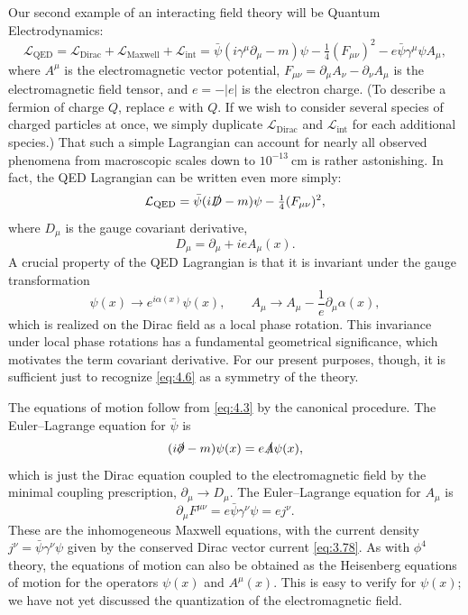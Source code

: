 Our second example of an interacting field theory will be Quantum
Electrodynamics:
\begin{equation}
  \mathcal{L}_{\mathrm{QED}} = \mathcal{L}_{\mathrm{Dirac}}
    + \mathcal{L}_{\mathrm{Maxwell}} + \mathcal{L}_{\mathrm{int}}
  = \bar{\psi}(i\gamma^\mu\partial_\mu - m)\psi
    - \tfrac{1}{4}(F_{\mu\nu})^2 - e\bar{\psi}\gamma^\mu\psi A_\mu ,
  \label{eq:4.3}
\end{equation}
where $A^\mu$ is the electromagnetic vector potential,
$F_{\mu\nu} = \partial_\mu A_\nu - \partial_\nu A_\mu$ is the electromagnetic
field tensor, and $e = -|e|$ is the electron charge.  (To describe a fermion
of charge $Q$, replace $e$ with $Q$.  If we wish to consider several species
of charged particles at once, we simply duplicate $\mathcal{L}_{\mathrm{Dirac}}$
and $\mathcal{L}_{\mathrm{int}}$ for each additional species.)  That such a
simple Lagrangian can account for nearly all observed phenomena from
macroscopic scales down to $10^{-13}\ \mathrm{cm}$ is rather astonishing.
In fact, the QED Lagrangian can be written even more simply:
\begin{equation}
  \mathcal{L}_{\mathrm{QED}} = \bar{\psi}(i\slashed{D} - m)\psi
    - \tfrac{1}{4}(F_{\mu\nu})^2 ,
  \label{eq:4.4}
\end{equation}
where $D_\mu$ is the gauge covariant derivative,
\begin{equation}
  D_\mu = \partial_\mu + ieA_\mu(x) .
  \label{eq:4.5}
\end{equation}
A crucial property of the QED Lagrangian is that it is invariant under the
gauge transformation
\begin{equation}
  \psi(x) \to e^{i\alpha(x)}\psi(x),\qquad
  A_\mu \to A_\mu - \frac{1}{e}\partial_\mu\alpha(x),
  \label{eq:4.6}
\end{equation}
which is realized on the Dirac field as a local phase rotation.  This
invariance under local phase rotations has a fundamental geometrical
significance, which motivates the term covariant derivative.  For our present
purposes, though, it is sufficient just to recognize \eqref{eq:4.6} as a
symmetry of the theory.

The equations of motion follow from \eqref{eq:4.3} by the canonical
procedure.  The Euler--Lagrange equation for $\bar{\psi}$ is
\begin{equation}
  (i\slashed{\partial} - m)\psi(x) = e\slashed{A}\psi(x),
  \label{eq:4.7}
\end{equation}
which is just the Dirac equation coupled to the electromagnetic field by the
minimal coupling prescription, $\partial_\mu \to D_\mu$.  The Euler--Lagrange
equation for $A_\mu$ is
\begin{equation}
  \partial_\mu F^{\mu\nu} = e\bar{\psi}\gamma^\nu\psi = e j^\nu .
  \label{eq:4.8}
\end{equation}
These are the inhomogeneous Maxwell equations, with the current density
$j^\nu = \bar{\psi}\gamma^\nu\psi$ given by the conserved Dirac vector current
\eqref{eq:3.78}.  As with $\phi^4$ theory, the equations of motion can also
be obtained as the Heisenberg equations of motion for the operators $\psi(x)$
and $A^\mu(x)$.  This is easy to verify for $\psi(x)$; we have not yet
discussed the quantization of the electromagnetic field.

